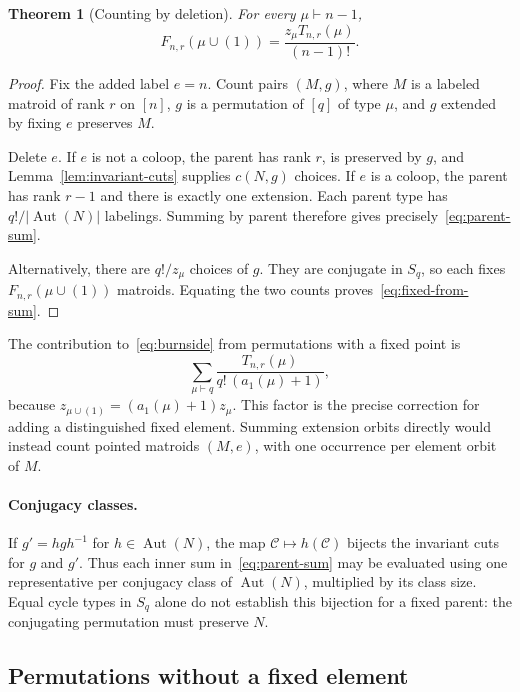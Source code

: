 \documentclass[11pt]{article}
\newtheorem{theorem}{Theorem}[section]
\theoremstyle{definition}
\DeclareMathOperator{\Aut}{Aut}
\begin{document}
\begin{theorem}[Counting by deletion]\label{thm:aggregation}
For every $\mu\vdash n-1$,
\begin{equation}\label{eq:fixed-from-sum}
F_{n,r}(\mu\cup(1))=\frac{z_\mu T_{n,r}(\mu)}{(n-1)!}.
\end{equation}
\end{theorem}
\begin{proof}
Fix the added label $e=n$. Count pairs $(M,g)$, where $M$ is a labeled
matroid of rank $r$ on $[n]$, $g$ is a permutation of $[q]$ of type $\mu$,
and $g$ extended by fixing $e$ preserves $M$.

Delete $e$. If $e$ is not a coloop, the parent has rank $r$, is preserved
by $g$, and Lemma~\ref{lem:invariant-cuts} supplies $c(N,g)$ choices.
If $e$ is a coloop, the parent has rank $r-1$ and there is exactly one
extension. Each parent type has $q!/|\Aut(N)|$ labelings. Summing by parent
therefore gives precisely~\eqref{eq:parent-sum}.

Alternatively, there are $q!/z_\mu$ choices of $g$. They are conjugate in
$S_q$, so each fixes $F_{n,r}(\mu\cup(1))$ matroids. Equating the two
counts proves~\eqref{eq:fixed-from-sum}.
\end{proof}

The contribution to~\eqref{eq:burnside} from permutations with a fixed point is
\begin{equation}\label{eq:fixed-contribution}
\sum_{\mu\vdash q}\frac{T_{n,r}(\mu)}{q!\,(a_1(\mu)+1)},
\end{equation}
because $z_{\mu\cup(1)}=(a_1(\mu)+1)z_\mu$. This factor is the precise
correction for adding a distinguished fixed element. Summing extension
orbits directly would instead count pointed matroids $(M,e)$, with one
occurrence per element orbit of $M$.

\paragraph{Conjugacy classes.}
If $g'=hgh^{-1}$ for $h\in\Aut(N)$, the map
$\mathcal C\mapsto h(\mathcal C)$ bijects the invariant cuts for $g$ and
$g'$. Thus each inner sum in~\eqref{eq:parent-sum} may be evaluated
using one representative per conjugacy class of $\Aut(N)$, multiplied by
its class size. Equal cycle types in $S_q$ alone do not establish this
bijection for a fixed parent: the conjugating permutation must preserve $N$.

\subsection{Permutations without a fixed element}
\end{document}
